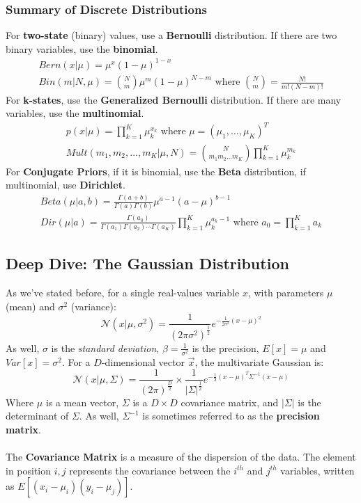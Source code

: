 \documentclass[11pt]{article} %
\begin{document}
\subsubsection{Summary of Discrete Distributions}

For {\bf two-state} (binary) values, use a {\bf Bernoulli} distribution. If there are two binary variables, use the {\bf binomial}.
\begin{gather}
Bern(x|\mu) = \mu^x(1-\mu)^{1-x} \\
Bin(m|N,\mu) = {N \choose m}\mu^m(1-\mu)^{N-m} \text{ where } {N \choose m} = \frac{N!}{m!(N-m)!}
\end{gather}
For {\bf k-states}, use the {\bf Generalized Bernoulli} distribution. If there are many variables, use the {\bf multinomial}.
\begin{gather}
p(x|\mu) = \prod_{k=1}^{K} \mu_k^{x_k} \text{ where } \mu = (\mu_1,\ldots,\mu_K)^T \\
Mult(m_1,m_2,\ldots,m_K | \mu, N ) = {N \choose m_1 m_2 \ldots m_K} \prod_{k=1}^{K} \mu_k^{m_k}
\end{gather}
For {\bf Conjugate Priors}, if it is binomial, use the {\bf Beta} distribution, if multinomial, use {\bf Dirichlet}.
\begin{gather}
Beta(\mu|a,b) = \frac{\Gamma(a+b)}{\Gamma(a)\Gamma(b)}\mu^{a-1}(a-\mu)^{b-1} \\
Dir(\mu|a) = \frac{\Gamma(a_0)}{\Gamma(a_1)\Gamma(a_2)\cdots\Gamma(a_K)} \prod_{k=1}^{K} \mu_k^{a_k-1} \text{ where }a_0 = \prod_{k=1}^{K} a_k
\end{gather}

\subsection{Deep Dive: The Gaussian Distribution}

As we've stated before, for a single real-values variable $x$, with parameters $\mu$ (mean) and $\sigma^2$ (variance):
\begin{equation}
\mathcal{N}(x|\mu,\sigma^2) = \frac{1}{(2\pi\sigma^2)^{\frac{1}{2}}} e^{-\frac{1}{2\sigma^2}(x-\mu)^2}
\end{equation}
As well, $\sigma$ is the {\em standard deviation}, $\beta = \frac{1}{\sigma^2}$ is the precision, $E[x] = \mu$ and $Var[x] = \sigma^2$. For a $D$-dimensional vector $\vec{x}$, the multivariate Gaussian is:
\begin{equation}
\mathcal{N}(x|\mu,\Sigma) = \frac{1}{(2\pi)^{\frac{D}{2}}} \times \frac{1}{| \Sigma |^{\frac{1}{2}}} e^{-\frac{1}{2}(x-\mu)^T\Sigma^{-1}(x-\mu)}
\end{equation}
Where $\mu$ is a mean vector, $\Sigma$ is a $D \times D$ covariance matrix, and $|\Sigma|$ is the determinant of $\Sigma$. As well, $\Sigma^{-1}$ is sometimes referred to as the {\bf precision matrix}. \\
~\\
The {\bf Covariance Matrix} is a measure of the dispersion of the data. The element in position $i,j$ represents the covariance between the $i^{th}$ and $j^{th}$ variables, written as $E[(x_i-\mu_i)(y_i-\mu_j)]$.
\end{document}
